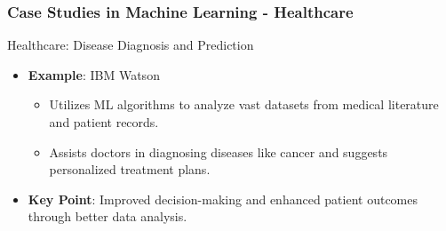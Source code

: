 \documentclass[aspectratio=169]{beamer}
\begin{document}
\begin{frame}[fragile]
    \frametitle{Case Studies in Machine Learning - Healthcare}
    \begin{block}{Healthcare: Disease Diagnosis and Prediction}
        \begin{itemize}
            \item \textbf{Example}: IBM Watson
            \begin{itemize}
                \item Utilizes ML algorithms to analyze vast datasets from medical literature and patient records.
                \item Assists doctors in diagnosing diseases like cancer and suggests personalized treatment plans.
            \end{itemize}
            \item \textbf{Key Point}: Improved decision-making and enhanced patient outcomes through better data analysis.
        \end{itemize}
    \end{block}
\end{frame}
\end{document}
